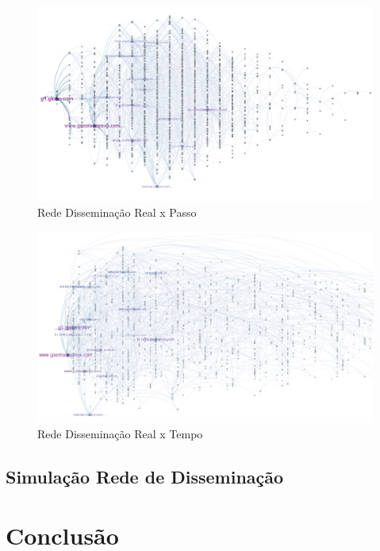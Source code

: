 \documentclass[a4paper,12pt]{article}
\begin{document}
\begin{figure}[h]
 \centering
 \includegraphics[scale=0.4]{../results/a.png}
 \caption{Rede Disseminação Real x Passo}
\end{figure}


\begin{figure}[h]
 \centering
 \includegraphics[scale=0.4]{../results/t.png}
 \caption{Rede Disseminação Real x Tempo}
\end{figure}

\subsection{Simulação Rede de Disseminação}



\section{Conclusão}



\pagebreak


\end{document}
